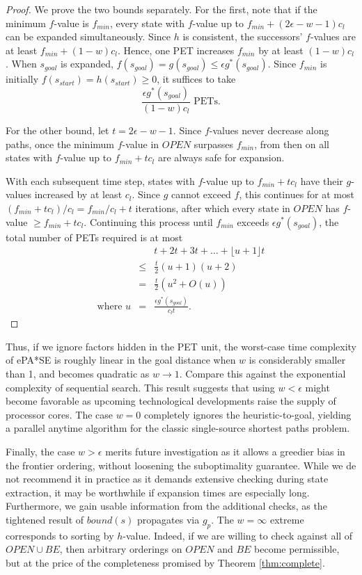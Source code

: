 \documentclass[letterpaper]{article}
\begin{document}
\begin{proof}
We prove the two bounds separately. For the first, note that if the minimum $f$-value is $f_{min}$, every state with $f$-value up to $f_{min} + (2\epsilon-w-1)c_l$ can be expanded simultaneously. Since $h$ is consistent, the successors' $f$-values are at least $f_{min} + (1-w)c_l$. Hence, one PET increases $f_{min}$ by at least $(1-w)c_l$. When $s_{goal}$ is expanded, $f(s_{goal}) = g(s_{goal}) \le \epsilon g^*(s_{goal})$. Since $f_{min}$ is initially $f(s_{start}) = h(s_{start}) \ge 0$, it suffices to take
\[\frac{\epsilon g^*(s_{goal})}{(1-w)c_l}\text{ PETs.}\]

For the other bound, let $t=2\epsilon-w-1$. Since $f$-values never decrease along paths, once the minimum $f$-value in $OPEN$ surpasses $f_{min}$, from then on all states with $f$-value up to $f_{min} + tc_l$ are always safe for expansion.

With each subsequent time step, states with $f$-value up to $f_{min} + tc_l$ have their $g$-values increased by at least $c_l$. Since $g$ cannot exceed $f$, this continues for at most $(f_{min} + tc_l) / c_l = f_{min}/c_l + t$ iterations, after which every state in $OPEN$ has $f$-value $\ge f_{min} + tc_l$. Continuing this process until $f_{min}$ exceeds $\epsilon g^*(s_{goal})$, the total number of PETs required is at most
\begin{eqnarray*}
&&t + 2t + 3t + \ldots + \lfloor u+1 \rfloor t
\\&\le& \frac t2 (u+1)(u+2)
\\&=& \frac t2 (u^2 + O(u))
\\\text{where }u &=& \frac{\epsilon g^*(s_{goal})}{c_lt}.
\end{eqnarray*}
\end{proof}

Thus, if we ignore factors hidden in the PET unit, the worst-case time complexity of ePA*SE is roughly linear in the goal distance when $w$ is considerably smaller than 1, and becomes quadratic as $w \rightarrow 1$. Compare this against the exponential complexity of sequential search. This result suggests that using $w < \epsilon$ might become favorable as upcoming technological developments raise the supply of processor cores. The case $w = 0$ completely ignores the heuristic-to-goal, yielding a parallel anytime algorithm for the classic  single-source shortest paths problem.

Finally, the case $w > \epsilon$ merits future investigation as it allows a greedier bias in the frontier ordering, without loosening the suboptimality guarantee. While we de not recommend it in practice as it demands extensive checking during state extraction, it may be worthwhile if expansion times are especially long. Furthermore, we gain usable information from the additional checks, as the tightened result of $bound(s)$ propagates via $g_p$. The $w = \infty$ extreme corresponds to sorting by $h$-value. Indeed, if we are willing to check against all of $OPEN\cup BE$, then arbitrary orderings on $OPEN$ and $BE$ become permissible, but at the price of the completeness promised by Theorem \ref{thm:complete}.
\end{document}
